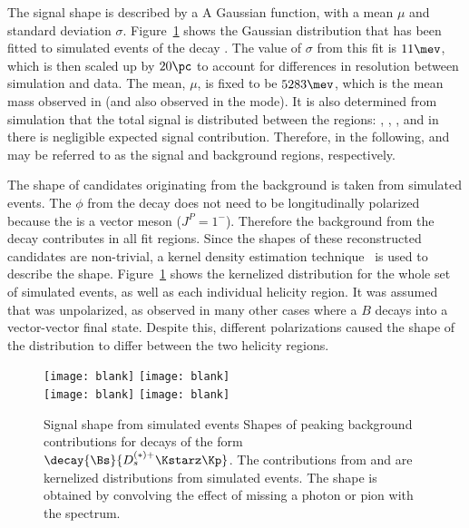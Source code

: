 The signal shape is described by a A Gaussian function, with a mean $\mu$ and standard deviation
$\sigma$.
Figure~\ref{fig:dsphi:sigshape} shows the Gaussian distribution that has been fitted to simulated
events of the decay \btodsphi.
The value of $\sigma$ from this fit is $11\mev$, which is then scaled up by $20\pc$ to account for
differences in resolution between simulation and data.
The mean, $\mu$, is fixed to be $5283\mev$, which is the mean mass observed in
\decay{\Bp}{\Dz\pip} (and also observed in the \Bs mode).
It is also determined from simulation that the total signal is distributed between the regions:
\pc, \pc, \pc, and in \rD there is negligible expected signal contribution.
Therefore, in the following, \rA and \rD may be referred to as the signal and background regions,
respectively.

The shape of \Bp candidates originating from the \btodsstrphi background is taken from simulated
events.
The $\phi$ from the decay \btodsstrphi does not need to be longitudinally polarized because the
\Dssp is a vector meson ($J^P=1^-$).
Therefore the background from the decay \btodsstrphi contributes in all fit regions.
Since the shapes of these reconstructed candidates are non-trivial, a kernel density estimation
technique~\cite{Cranmer:2000du} is used to describe the shape.
Figure~\ref{fig:dsphi:sigshape} shows the kernelized distribution for the whole set of simulated
events, as well as each individual helicity region.
It was assumed that \Dssp was unpolarized, as observed in many other cases where a
$B$ decays into a vector-vector final state.
Despite this, different \phii polarizations caused the shape of the distribution to differ
between the two helicity regions.

\begin{figure}
  \begin{center}
    \texttt{[image: blank]}
    \texttt{[image: blank]}\\
    \texttt{[image: blank]}
    \texttt{[image: blank]}
    \caption[Shape contributions from signal \btodsphi, and \btodsstrphi]
    {
      Signal shape from simulated events
      Shapes of peaking background contributions for
      decays of the form $\decay{\Bs}{D_s^{(*)+}\Kstarz\Kp}$.
      The contributions from \btodsstrphi and \bstodskstrk are kernelized distributions from
      simulated events.
      The \bstodsstrkstrk shape is obtained by convolving the
      effect of missing a photon or pion with the \bstodskstrk spectrum.
    }
    \label{fig:dsphi:sigshape}
  \end{center}
\end{figure}


